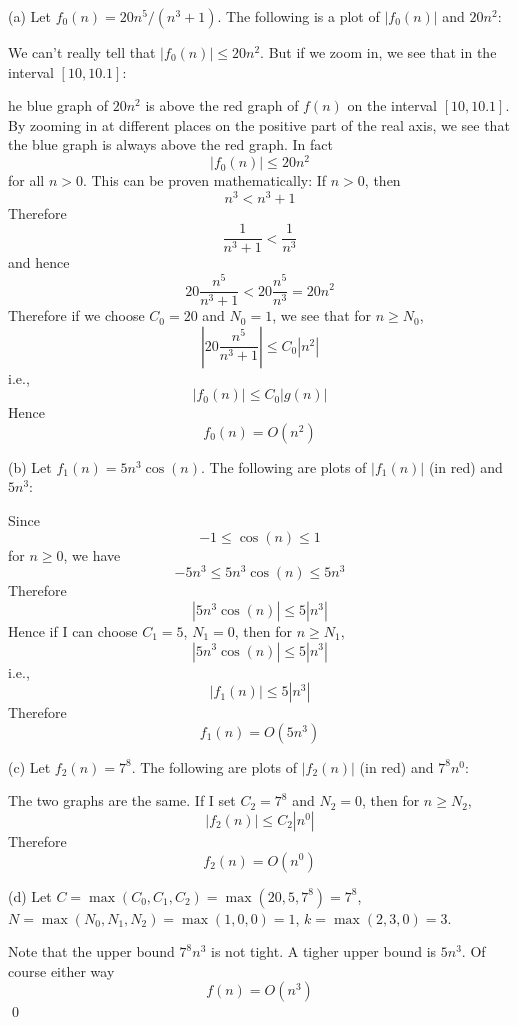 (a)
Let $f_0(n) = 20 n^5/(n^3 + 1)$.
The following is a plot of $|f_0(n)|$ and $20n^2$:

We can't really tell that $|f_0(n)| \leq 20 n^2$.
But if we zoom in, we see that in the interval $[10, 10.1]$:

he blue graph of $20n^2$ is above the red graph of $f(n)$
on the interval $[10, 10.1]$.
By zooming in at different places on the positive part of the real
axis, we see that the blue graph is always above the red graph.
In fact
\[
|f_0(n)| \leq 20n^2
\]
for all $n > 0$.
This can be proven mathematically:
If $n > 0$, then
\[
n^3 < n^3 + 1
\]
Therefore
\[
\frac{1}{n^3 + 1} < \frac{1}{n^3}
\]
and hence
\[
20 \frac{n^5}{n^3 + 1} < 20 \frac{n^5}{n^3} = 20 n^2
\]
Therefore if we choose $C_0 = 20$ and $N_0 = 1$,
we see that for $n \geq N_0$,
\[
\left|
20 \frac{n^5}{n^3 + 1}
\right| 
\leq C_0
\left|
n^2
\right|
\]
i.e.,
\[
|f_0(n)| \leq C_0|g(n)|
\]
Hence
\[
f_0(n) = O(n^2)
\]

(b)
Let $f_1(n) = 5n^3\cos(n)$.
The following are plots of $|f_1(n)|$ (in red) and $5n^3$:

Since
\[
-1 \leq \cos(n) \leq 1
\]
for $n \geq 0$, we have
\[
-5n^3 \leq 5n^3 \cos(n) \leq 5n^3
\]
Therefore
\[
|5n^3 \cos(n)| \leq 5|n^3|
\]
Hence if I can choose $C_1 = 5$, $N_1 = 0$,
then for $n \geq N_1$,
\[
|5n^3 \cos(n)| \leq 5|n^3|
\]
i.e.,
\[
|f_1(n)| \leq 5|n^3|
\]
Therefore
\[
f_1(n) = O(5n^3)
\]

(c)
Let $f_2(n) = 7^8$.
The following are plots of $|f_2(n)|$ (in red) and $7^8n^0$:

The two graphs are the same.
If I set $C_2 = 7^8$ and $N_2 = 0$, then for $n \geq N_2$,
\[
|f_2(n)| \leq C_2|n^0|
\]
Therefore
\[
f_2(n) = O(n^0)
\]

(d) Let $C = \max(C_0, C_1, C_2) = \max(20, 5, 7^8) = 7^8$,
$N = \max(N_0, N_1, N_2) = \max(1, 0, 0) = 1$,
$k = \max(2, 3, 0) = 3$.



Note that the upper bound $7^8 n^3$ is not tight.
A tigher upper bound is $5n^3$.
Of course either way
\[
f(n) = O(n^3)
\]
\qed
